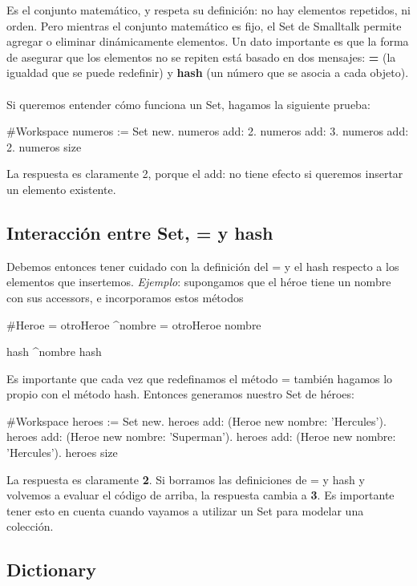 \documentclass[a4paper,12pt]{book}
\begin{document}
Es el conjunto matemático, y respeta su definición: no hay elementos repetidos, ni orden. Pero mientras
el conjunto matemático es fijo, el Set de Smalltalk permite agregar o eliminar dinámicamente elementos. 
Un dato importante es que la forma de asegurar que los elementos no se repiten está basado en dos mensajes:
\textbf{=} (la igualdad que se puede redefinir) y \textbf{hash} (un número que se asocia a cada objeto).
\\
\\
Si queremos entender cómo funciona un Set, hagamos la siguiente prueba:

\begin{code}
#Workspace
numeros := Set new.
numeros add: 2.
numeros add: 3.
numeros add: 2.
numeros size
\end{code}

La respuesta es claramente 2, porque el add: no tiene efecto si queremos insertar un elemento existente.

\subsection{Interacción entre Set, = y hash}
Debemos entonces tener cuidado con la definición del = y el hash respecto a los elementos que insertemos.
\textit{Ejemplo}: supongamos que el héroe tiene un nombre con sus accessors, e incorporamos estos métodos

\begin{code}
#Heroe
= otroHeroe
    ^nombre = otroHeroe nombre
    
hash
    ^nombre hash
\end{code}

Es importante que cada vez que redefinamos el método = también hagamos lo propio con el método hash.
Entonces generamos nuestro Set de héroes:

\begin{code}
#Workspace
heroes := Set new.
heroes add: (Heroe new nombre: 'Hercules').
heroes add: (Heroe new nombre: 'Superman').
heroes add: (Heroe new nombre: 'Hercules').
heroes size
\end{code}

La respuesta es claramente \textbf{2}. Si borramos las definiciones de = y hash y volvemos a evaluar 
el código de arriba, la respuesta cambia a \textbf{3}. Es importante tener esto en cuenta cuando
vayamos a utilizar un Set para modelar una colección.

\subsection{Dictionary}
\end{document}
